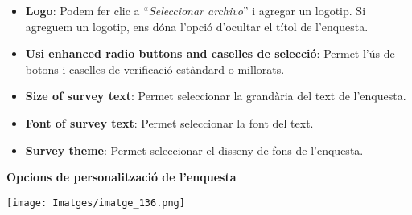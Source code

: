 \documentclass[
]{article}
\providecommand{\tightlist}{%
  \setlength{\itemsep}{0pt}\setlength{\parskip}{0pt}}
\begin{document}
\begin{itemize}
\tightlist
\item
  \textbf{Logo}: Podem fer clic a ``\emph{Seleccionar archivo}'' i agregar un logotip. Si agreguem un logotip, ens dóna l'opció d'ocultar el títol de l'enquesta.
\item
  \textbf{Usi enhanced radio buttons and caselles de selecció}: Permet l'ús de botons i caselles de verificació estàndard o millorats.
\item
  \textbf{Size of survey text}: Permet seleccionar la grandària del text de l'enquesta.
\item
  \textbf{Font of survey text}: Permet seleccionar la font del text.
\item
  \textbf{Survey theme}: Permet seleccionar el disseny de fons de l'enquesta.
\end{itemize}

\textbf{Opcions de personalització de l'enquesta}

\texttt{[image: Imatges/imatge\_136.png]}
\end{document}
